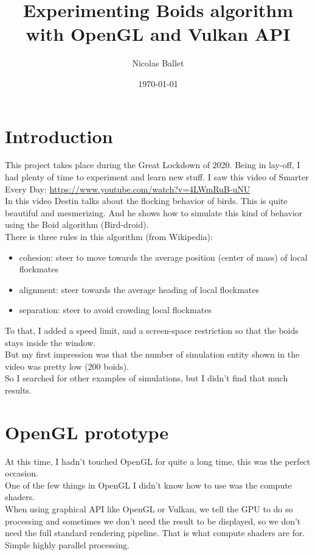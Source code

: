 \documentclass{article}
\title{Experimenting Boids algorithm with OpenGL and Vulkan API}
\author{Nicolas Ballet}
\date{\today}
\begin{document}
\maketitle
\tableofcontents
\newpage
\section{Introduction}
This project takes place during the Great Lockdown of 2020. Being in lay-off, I had plenty of time to experiment and learn new stuff.
I saw this video of Smarter Every Day: \url{https://www.youtube.com/watch?v=4LWmRuB-uNU}\\
In this video Destin talks about the flocking behavior of birds. This is quite beautiful and mesmerizing. And he shows how to simulate this kind of behavior using the Boid algorithm (Bird-droid).\\
There is three rules in this algorithm (from Wikipedia):
\begin{itemize}
    \item cohesion: steer to move towards the average position (center of mass) of local flockmates
    \item alignment: steer towards the average heading of local flockmates
    \item separation: steer to avoid crowding local flockmates
\end{itemize}
To that, I added a speed limit, and a screen-space restriction so that the boids stays inside the window.\\

But my first impression was that the number of simulation entity shown in the video was pretty low (200 boids).\\
So I searched for other examples of simulations, but I didn't find that much results.

\section{OpenGL prototype}
At this time, I hadn't touched OpenGL for quite a long time, this was the perfect occasion.\\
One of the few things in OpenGL I didn't know how to use was the compute shaders.\\
When using graphical API like OpenGL or Vulkan, we tell the GPU to do so processing and sometimes we don't need the result to be displayed, so we don't need the full standard rendering pipeline. That is what compute shaders are for. Simple highly parallel processing.\\
\end{document}
